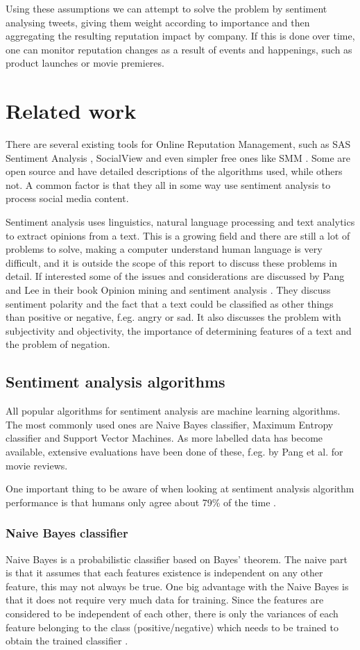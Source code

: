 \documentclass[a4paper]{article}
\begin{document}
Using these assumptions we can attempt to solve the problem by sentiment analysing tweets, giving them weight according to importance and then aggregating the resulting reputation impact by company. If this is done over time, one can monitor reputation changes as a result of events and happenings, such as product launches or movie premieres.

\section{Related work}
There are several existing tools for Online Reputation Management, such as SAS Sentiment Analysis \cite{SAS}, SocialView \cite{SocialView} and even simpler free ones like SMM \cite{SMM}. Some are open source and have detailed descriptions of the algorithms used, while others not. A common factor is that they all in some way use sentiment analysis to process social media content.

Sentiment analysis uses linguistics, natural language processing and text analytics to extract opinions from a text. This is a growing field and there are still a lot of problems to solve, making a computer understand human language is very difficult, and it is outside the scope of this report to discuss these problems in detail. If interested some of the issues and considerations are discussed by Pang and Lee in their book Opinion mining and sentiment analysis \cite{PangLee}. They discuss sentiment polarity and the fact that a text could be classified as other things than positive or negative, f.eg. angry or sad. It also discusses the problem with subjectivity and objectivity, the importance of determining features of a text and the problem of negation.

\subsection{Sentiment analysis algorithms}
All popular algorithms for sentiment analysis are machine learning algorithms. The most commonly used ones are Naive Bayes classifier, Maximum Entropy classifier and Support Vector Machines. As more labelled data has become available, extensive evaluations have been done of these, f.eg.  by Pang et al.\cite{Pangetal} for movie reviews.

One important thing to be aware of when looking at sentiment analysis algorithm performance is that humans only agree about 79\% of the time \cite{79percent}.

\subsubsection{Naive Bayes classifier}
Naive Bayes is a probabilistic classifier based on Bayes’ theorem. The naive part is that it assumes that each features existence is independent on any other feature, this may not always be true. One big advantage with the Naive Bayes is that it does not require very much data for training. Since the features are considered to be independent of each other, there is only the variances of each feature belonging to the class (positive/negative) which needs to be trained to obtain the trained classifier \cite{bayes}.
\end{document}
